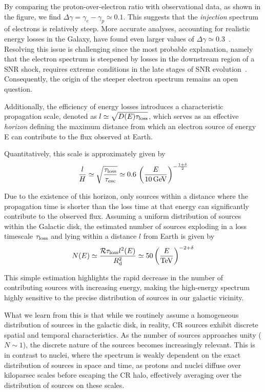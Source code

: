 By comparing the proton-over-electron ratio with observational data, as shown in the figure, we find $\Delta \gamma = \gamma_e-\gamma_p \simeq 0.1$. This suggests that the \emph{injection} spectrum of electrons is relatively steep. More accurate analyses, accounting for realistic energy losses in the Galaxy, have found even larger values of $\Delta \gamma \simeq 0.3$~\cite{Evoli2021prd}. Resolving this issue is challenging since the most probable explanation, namely that the electron spectrum is steepened by losses in the downstream region of a SNR shock, requires extreme conditions in the late stages of SNR evolution~\cite{Cristofari2021aa}. Consequently, the origin of the steeper electron spectrum remains an open question.

Additionally, the efficiency of energy losses introduces a characteristic propagation scale, denoted as $l \simeq \sqrt{D(E) \tau_{\rm loss}}$, which serves as an effective \emph{horizon} defining the maximum distance from which an electron source of energy E can contribute to the flux observed at Earth.

Quantitatively, this scale is approximately given by
%
\begin{equation}
\frac{l}{H} \simeq \sqrt{\frac{\tau_{\rm loss}}{\tau_{\rm esc}}} \simeq 0.6 \, \left(\frac{E}{10\,\text{GeV}}\right)^{-\frac{1+\delta}{2}}
\end{equation}

Due to the existence of this horizon, only sources within a distance where the propagation time is shorter than the loss time at that energy can significantly contribute to the observed flux. Assuming a uniform distribution of sources within the Galactic disk, the estimated number of sources exploding in a loss timescale $\tau_{\rm loss}$ and lying within a distance $l$ from Earth is given by 
%
\begin{equation}\label{eq:nleptons}
N(E) \simeq \frac{\mathcal R \tau_{\rm loss} l^2(E)}{R_{\rm d}^2} \simeq 50 \left(\frac{E}{\rm TeV}\right)^{-2 + \delta}
\end{equation}

This simple estimation highlights the rapid decrease in the number of contributing sources with increasing energy, making the high-energy spectrum highly sensitive to the precise distribution of sources in our galactic vicinity.

What we learn from this is that while we routinely assume a homogeneous distribution of sources in the galactic disk, in reality, CR sources exhibit discrete spatial and temporal characteristics. As the number of sources approaches unity ($N \sim 1$), the discrete nature of the sources becomes increasingly relevant. This is in contrast to nuclei, where the spectrum is weakly dependent on the exact distribution of sources in space and time, as protons and nuclei diffuse over kiloparsec scales before escaping the CR halo, effectively averaging over the distribution of sources on these scales.

